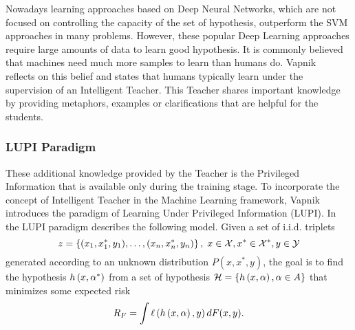 Nowadays learning approaches based on Deep Neural Networks, which are not focused on controlling the capacity of the set of hypothesis, outperform the SVM approaches in many problems. However, these popular Deep Learning approaches require large amounts of data to learn good hypothesis.
It is commonly believed that machines need much more samples to learn than humans do. Vapnik~\cite{VapnikV09, VapnikI15a} reflects on this belief and states that humans typically learn under the supervision of an Intelligent Teacher.
This Teacher shares important knowledge by providing metaphors, examples or clarifications that are helpful for the students.



\subsubsection*{LUPI Paradigm}
These additional knowledge provided by the Teacher is the Privileged Information that is available only during the training stage.
To incorporate the concept of Intelligent Teacher in the Machine Learning framework, Vapnik introduces the paradigm of Learning Under Privileged Information (LUPI).
In the LUPI paradigm describes the following model. Given a set of i.i.d. triplets
$$ z = \left\{(x_1, x^*_1, y_1), \ldots, (x_n,x^*_n, y_n)\right\}, \; x \in \mathcal{X}, x^* \in \mathcal{X}^*, y \in \mathcal{Y} $$
generated according to an unknown distribution $P(x, x^*, y)$, the goal is to find the hypothesis $h\left(x, \alpha^*\right)$ from a set of hypothesis $\mathcal{H} = \left\{h\left(x, \alpha\right), \alpha \in A\right\}$ that minimizes some expected risk 
$$ R_F = \int \ell\left( h\left(x, \alpha\right), y\right) dF(x, y). $$

